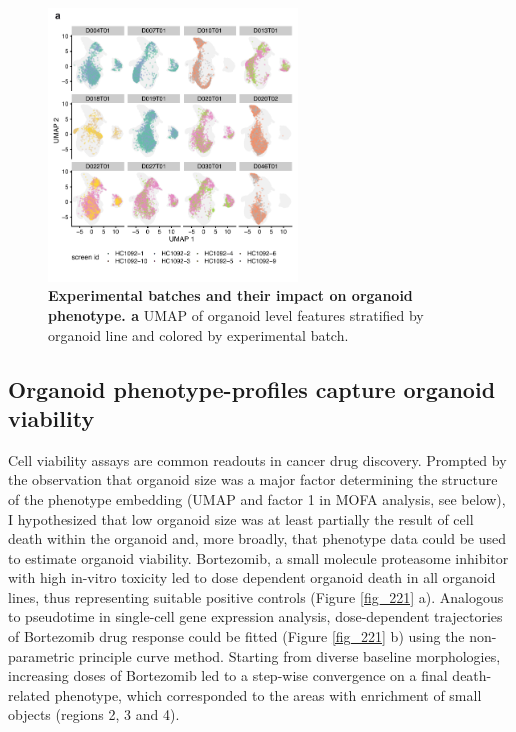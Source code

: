 \begin{flushleft}
\bigbreak

\begin{figure}[!h]
\centering
\includegraphics[width=250,
                height=\textheight,
                keepaspectratio]{figures/promise/pdf/fig_1_6.pdf}
\caption[Experimental batches and their impact on organoid phenotype]{\textbf{Experimental batches and their impact on organoid phenotype. a} UMAP of organoid level features stratified by organoid line and colored by experimental batch.}
\label{fig_216}
\end{figure}
\clearpage


\subsection{Organoid phenotype-profiles capture organoid viability}

Cell viability assays are common readouts in cancer drug discovery. Prompted by the observation that organoid size was a major factor determining the structure of the phenotype embedding (UMAP and factor 1 in MOFA analysis, see below), I hypothesized that low organoid size was at least partially the result of cell death within the organoid and, more broadly, that phenotype data could be used to estimate organoid viability. Bortezomib, a small molecule proteasome inhibitor with high in-vitro toxicity led to dose dependent organoid death in all organoid lines, thus representing suitable positive controls (Figure \ref{fig_221} a). Analogous to pseudotime in single-cell  gene expression analysis, dose-dependent trajectories of Bortezomib drug response could be fitted (Figure \ref{fig_221} b) using the non-parametric principle curve method. Starting from diverse baseline morphologies, increasing doses of Bortezomib led to a step-wise convergence on a final death-related phenotype, which corresponded to the areas with enrichment of small objects (regions 2, 3 and 4). 


\end{flushleft}
